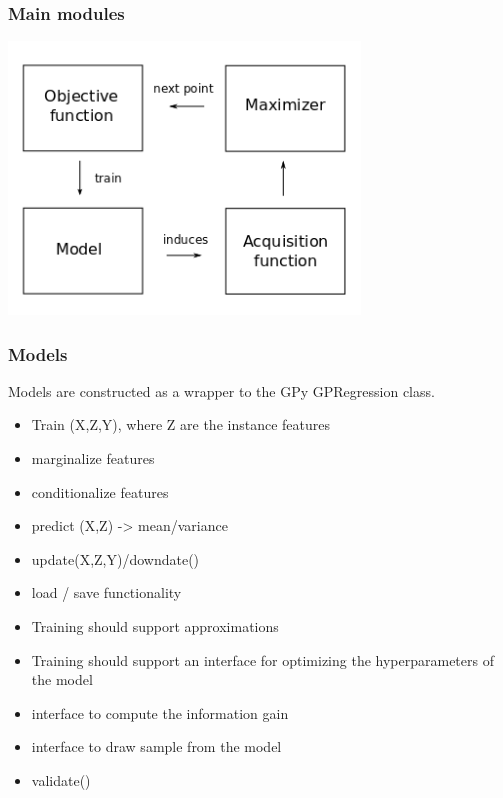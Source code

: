 \documentclass[10pt,handout]{beamer}
\begin{document}
\begin{frame}
\frametitle{Main modules}

\begin{center}
\includegraphics[width=0.7\textwidth]{robo_framework.png}
\end{center}


\end{frame}

\begin{frame}
\frametitle{Models}

Models are constructed as a wrapper to the GPy GPRegression class.

\begin{itemize}
\item Train (X,Z,Y), where Z are the instance features
\item marginalize features
\item conditionalize features
\item predict (X,Z) -> mean/variance
\item update(X,Z,Y)/downdate()
\item load / save functionality
\item Training should support approximations
\item Training should support an interface for optimizing the hyperparameters of the model
\item interface to compute the information gain
\item interface to draw sample from the model
\item validate()
\end{itemize}

\end{frame}
\end{document}

